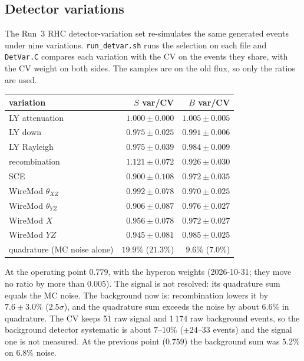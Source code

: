 \documentclass[11pt,a4paper]{article}
\begin{document}
\subsection{Detector variations}
\label{sec:detvar}
The Run~3 RHC detector-variation set re-simulates the same generated events under
nine variations. \texttt{run\_detvar.sh} runs the selection on each file and
\texttt{DetVar.C} compares each variation with the CV on the events they share, with
the CV weight on both sides. The samples are on the old flux, so only the ratios are
used.

\begin{center}
\begin{tabular}{lrr}
\toprule
variation & $S$ var/CV & $B$ var/CV \\
\midrule
LY attenuation         & $1.000\pm0.000$ & $1.005\pm0.005$ \\
LY down                & $0.975\pm0.025$ & $0.991\pm0.006$ \\
LY Rayleigh            & $0.975\pm0.039$ & $0.984\pm0.009$ \\
recombination          & $1.121\pm0.072$ & $0.926\pm0.030$ \\
SCE                    & $0.900\pm0.108$ & $0.972\pm0.035$ \\
WireMod $\theta_{XZ}$  & $0.992\pm0.078$ & $0.970\pm0.025$ \\
WireMod $\theta_{YZ}$  & $0.906\pm0.087$ & $0.976\pm0.027$ \\
WireMod $X$            & $0.956\pm0.078$ & $0.972\pm0.027$ \\
WireMod $YZ$           & $0.945\pm0.081$ & $0.985\pm0.025$ \\
\midrule
quadrature (MC noise alone) & $19.9\%$ ($21.3\%$) & $9.6\%$ ($7.0\%$) \\
\bottomrule
\end{tabular}
\end{center}

\noindent At the operating point $0.779$, with the hyperon weights (2026-10-31; they move no
ratio by more than $0.005$). The signal is not resolved: its quadrature sum
equals the MC noise. The background now is: recombination lowers it by
$7.6\pm3.0\%$ ($2.5\sigma$), and the quadrature sum exceeds the noise by about $6.6\%$
in quadrature. The CV keeps 51 raw signal and 1\,174 raw background events, so the
background detector systematic is about $7$--$10\%$ ($\pm24$--$33$ events) and the signal
one is not measured. At the previous point ($0.759$) the background sum was $5.2\%$ on
$6.8\%$ noise.
\end{document}
